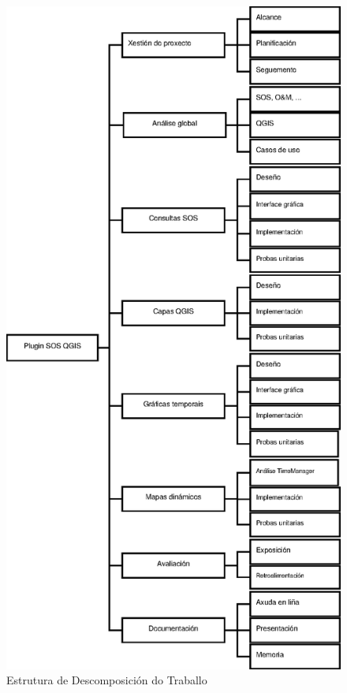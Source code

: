 \begin{figure}[hbtp]
\centering
\includegraphics[height=1.0\textheight]{images/edt.eps}
\caption{Estrutura de Descomposición do Traballo}
\label{fig:edt} 
\end{figure}

